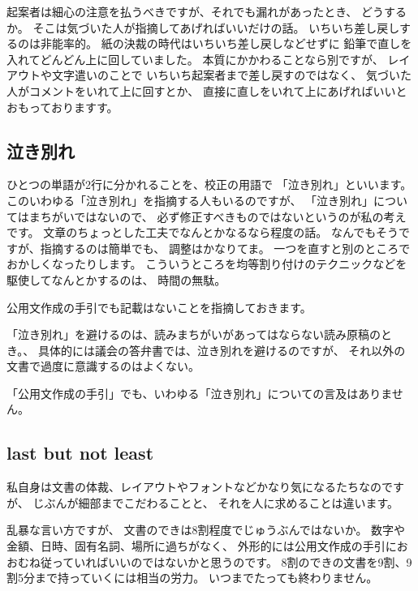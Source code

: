 \documentclass[uplatex,jis2004,dvipdfmx,12pt]{jsarticle}
\begin{document}
起案者は細心の注意を払うべきですが、それでも漏れがあったとき、
どうするか。
そこは気づいた人が指摘してあげればいいだけの話。
いちいち差し戻しするのは非能率的。
紙の決裁の時代はいちいち差し戻しなどせずに
鉛筆で直しを入れてどんどん上に回していました。
本質にかかわることなら別ですが、
レイアウトや文字遣いのことで
いちいち起案者まで差し戻すのではなく、
気づいた人がコメントをいれて上に回すとか、
直接に直しをいれて上にあげればいいとおもっておりますす。




\subsection{泣き別れ}
ひとつの単語が2行に分かれることを、校正の用語で
「泣き別れ」といいます。
このいわゆる「泣き別れ」を指摘する人もいるのですが、
「泣き別れ」についてはまちがいではないので、
必ず修正すべきものではないというのが私の考えです。
文章のちょっとした工夫でなんとかなるなら程度の話。
なんでもそうですが、指摘するのは簡単でも、
調整はかなりてま。
一つを直すと別のところでおかしくなったりします。
こういうところを均等割り付けのテクニックなどを駆使してなんとかするのは、
時間の無駄。

公用文作成の手引でも記載はないことを指摘しておきます。

「泣き別れ」を避けるのは、読みまちがいがあってはならない読み原稿のとき。、
具体的には議会の答弁書では、泣き別れを避けるのですが、
それ以外の文書で過度に意識するのはよくない。

「公用文作成の手引」でも、いわゆる「泣き別れ」についての言及はありません。
\fi


\subsection{last but not least}
私自身は文書の体裁、レイアウトやフォントなどかなり気になるたちなのですが、
じぶんが細部までこだわることと、
それを人に求めることは違います。

乱暴な言い方ですが、
文書のできは8割程度でじゅうぶんではないか。
数字や金額、日時、固有名詞、場所に過ちがなく、
外形的には公用文作成の手引におおむね従っていればいいのではないかと思うのです。
8割のできの文書を9割、9割5分まで持っていくには相当の労力。
いつまでたっても終わりません。
\end{document}
